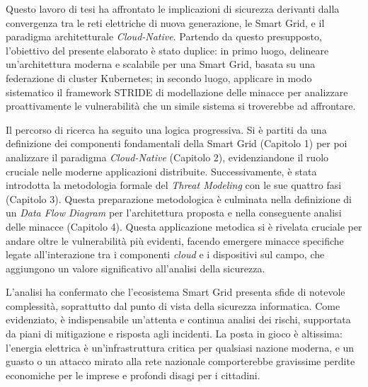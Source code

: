 


Questo lavoro di tesi ha affrontato le implicazioni di sicurezza derivanti dalla convergenza tra le reti elettriche di nuova generazione, le Smart Grid, e il paradigma architetturale \textit{Cloud-Native}. Partendo da questo presupposto, l'obiettivo del presente elaborato è stato duplice: in primo luogo, delineare un'architettura moderna e scalabile per una Smart Grid, basata su una federazione di cluster Kubernetes; in secondo luogo, applicare in modo sistematico il framework STRIDE di modellazione delle minacce  per analizzare proattivamente le vulnerabilità che un simile sistema si troverebbe ad affrontare.


Il percorso di ricerca ha seguito una logica progressiva. Si è partiti da una definizione dei componenti fondamentali della Smart Grid (Capitolo 1) per poi analizzare il paradigma \textit{Cloud-Native} (Capitolo 2), evidenziandone il ruolo cruciale nelle moderne applicazioni distribuite. Successivamente, è stata introdotta la metodologia formale del \textit{Threat Modeling} con le sue quattro fasi (Capitolo 3). Questa preparazione metodologica è culminata nella definizione di un \textit{Data Flow Diagram} per l'architettura proposta e nella conseguente analisi delle minacce (Capitolo 4). Questa applicazione metodica si è rivelata cruciale per andare oltre le vulnerabilità più evidenti, facendo emergere minacce specifiche legate all'interazione tra i componenti \textit{cloud} e i dispositivi sul campo, che aggiungono un valore significativo all'analisi della sicurezza.


L'analisi ha confermato che l'ecosistema Smart Grid presenta sfide di notevole complessità, soprattutto dal punto di vista della sicurezza informatica. Come evidenziato, è indispensabile un'attenta e continua analisi dei rischi, supportata da piani di mitigazione e risposta agli incidenti. La posta in gioco è altissima: l'energia elettrica è un'infrastruttura critica per qualsiasi nazione moderna, e un guasto o un attacco mirato alla rete nazionale comporterebbe gravissime perdite economiche per le imprese e profondi disagi per i cittadini.


